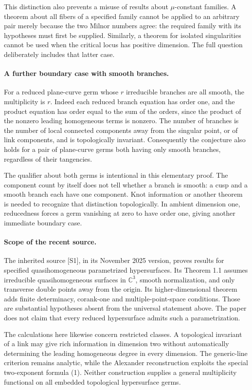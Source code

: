 \documentclass[11pt]{article}
\begin{document}
This distinction also prevents a misuse of results about $\mu$-constant families. A theorem about all fibers of a specified family cannot be applied to an arbitrary pair merely because the two Milnor numbers agree: the required family with its hypotheses must first be supplied. Similarly, a theorem for isolated singularities cannot be used when the critical locus has positive dimension. The full question deliberately includes that latter case.

\paragraph{A further boundary case with smooth branches.}
For a reduced plane-curve germ whose $r$ irreducible branches are all smooth, the multiplicity is $r$. Indeed each reduced branch equation has order one, and the product equation has order equal to the sum of the orders, since the product of the nonzero leading homogeneous terms is nonzero. The number of branches is the number of local connected components away from the singular point, or of link components, and is topologically invariant. Consequently the conjecture also holds for a pair of plane-curve germs both having only smooth branches, regardless of their tangencies.

The qualifier about both germs is intentional in this elementary proof. The component count by itself does not tell whether a branch is smooth: a cusp and a smooth branch each have one component. Knot information or another theorem is needed to recognize that distinction topologically. In ambient dimension one, reducedness forces a germ vanishing at zero to have order one, giving another immediate boundary case.

\paragraph{Scope of the recent source.}
The inherited source [S1], in its November 2025 version, proves results for specified quasihomogeneous parametrized hypersurfaces. Its Theorem 1.1 assumes irreducible quasihomogeneous surfaces in $\mathbb C^3$, smooth normalization, and only transverse double points away from the origin. Its higher-dimensional theorem adds finite determinacy, corank-one and multiple-point-space conditions. Those are substantial hypotheses absent from the universal statement above. The paper does not claim that every reduced hypersurface admits such a parametrization.

The calculations here likewise concern restricted classes. A topological invariant of a link may give rich information in dimension two without automatically determining the leading homogeneous degree in every dimension. The generic-line criterion remains analytic, while the Alexander reconstruction exploits the special two-exponent formula (1). Neither construction supplies a general multiplicity functional on all embedded topological hypersurface germs.
\end{document}
